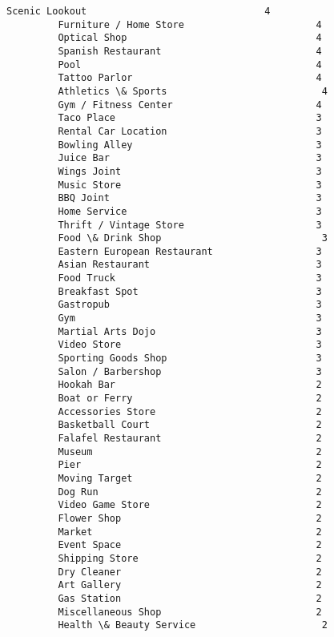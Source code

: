 \documentclass[11pt]{article}
\begin{document}
\begin{Verbatim}[commandchars=\\\{\}]
         Scenic Lookout                               4
         Furniture / Home Store                       4
         Optical Shop                                 4
         Spanish Restaurant                           4
         Pool                                         4
         Tattoo Parlor                                4
         Athletics \& Sports                           4
         Gym / Fitness Center                         4
         Taco Place                                   3
         Rental Car Location                          3
         Bowling Alley                                3
         Juice Bar                                    3
         Wings Joint                                  3
         Music Store                                  3
         BBQ Joint                                    3
         Home Service                                 3
         Thrift / Vintage Store                       3
         Food \& Drink Shop                            3
         Eastern European Restaurant                  3
         Asian Restaurant                             3
         Food Truck                                   3
         Breakfast Spot                               3
         Gastropub                                    3
         Gym                                          3
         Martial Arts Dojo                            3
         Video Store                                  3
         Sporting Goods Shop                          3
         Salon / Barbershop                           3
         Hookah Bar                                   2
         Boat or Ferry                                2
         Accessories Store                            2
         Basketball Court                             2
         Falafel Restaurant                           2
         Museum                                       2
         Pier                                         2
         Moving Target                                2
         Dog Run                                      2
         Video Game Store                             2
         Flower Shop                                  2
         Market                                       2
         Event Space                                  2
         Shipping Store                               2
         Dry Cleaner                                  2
         Art Gallery                                  2
         Gas Station                                  2
         Miscellaneous Shop                           2
         Health \& Beauty Service                      2

\end{Verbatim}
\end{document}
